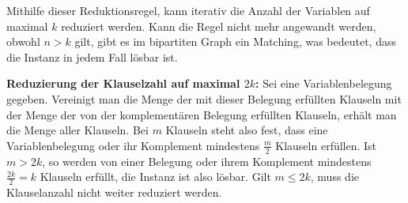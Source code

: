 Mithilfe dieser Reduktionsregel, kann iterativ die Anzahl der Variablen auf maximal $k$ reduziert werden. Kann die Regel nicht mehr angewandt werden, obwohl $n>k$ gilt, gibt es im bipartiten Graph ein Matching, was bedeutet, dass die Instanz in jedem Fall lösbar ist.

\textbf{Reduzierung der Klauselzahl auf maximal $2k$:} Sei eine Variablenbelegung gegeben. Vereinigt man die Menge der mit dieser Belegung erfüllten Klauseln mit der Menge der von der komplementären Belegung erfüllten Klauseln, erhält man die Menge aller Klauseln. Bei $m$ Klauseln steht also fest, dass eine Variablenbelegung oder ihr Komplement mindestens $\frac{m}{2}$ Klauseln erfüllen. Ist $m > 2k$, so werden von einer Belegung oder ihrem Komplement mindestens $\frac{2k}{2}=k$ Klauseln erfüllt, die Instanz ist also lösbar. Gilt $m \leq 2k$, muss die Klauselanzahl nicht weiter reduziert werden.

\subexercise









